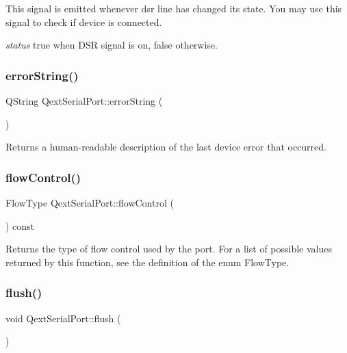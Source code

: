 This signal is emitted whenever dsr line has changed its state. You may use this signal to check if device is connected.

{\itshape status} true when D\+SR signal is on, false otherwise. \mbox{\label{classQextSerialPort_aaafe63e85bf7e47ed8442be686e3d262}} 
\subsubsection{\texorpdfstring{error\+String()}{errorString()}}
{\footnotesize\ttfamily Q\+String Qext\+Serial\+Port\+::error\+String (\begin{DoxyParamCaption}{ }\end{DoxyParamCaption})}

Returns a human-\/readable description of the last device error that occurred. \mbox{\label{classQextSerialPort_ae4c4bf79d59ed28be336e020b7459b93}} 
\subsubsection{\texorpdfstring{flow\+Control()}{flowControl()}}
{\footnotesize\ttfamily Flow\+Type Qext\+Serial\+Port\+::flow\+Control (\begin{DoxyParamCaption}{ }\end{DoxyParamCaption}) const}

Returns the type of flow control used by the port. For a list of possible values returned by this function, see the definition of the enum Flow\+Type. \mbox{\label{classQextSerialPort_ac7448603fb4601540c4b6fc999c953e7}} 
\subsubsection{\texorpdfstring{flush()}{flush()}}
{\footnotesize\ttfamily void Qext\+Serial\+Port\+::flush (\begin{DoxyParamCaption}{ }\end{DoxyParamCaption})}

